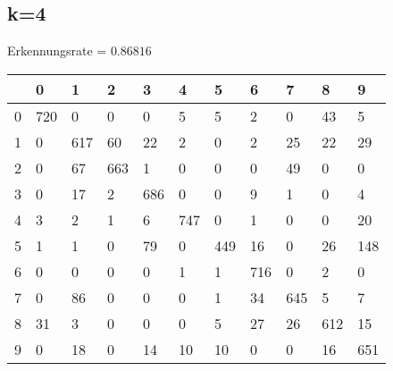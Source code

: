 \documentclass[a4paper,10pt]{article}
\begin{document}
		\subsection*{k=4}
		Erkennungsrate = $0.86816$\\
		\begin{tabular}{||l|l|l|l|l|l|l|l|l|l|l|}
		 \hline 
			& 0 & 1 & 2 & 3 & 4 & 5 & 6 & 7 & 8 & 9 \\ \hline \hline
			0 & 720    &  0 &     0    &  0   &   5   &   5  &    2  &    0   &  43  &    5\\ \hline
			1 &  0  &  617   &  60  &   22  &    2  &    0   &   2   &  25  &   22   &  29\\ \hline
			2 &0    & 67  &  663   &   1  &    0   &   0  &    0    & 49   &   0   &   0\\ \hline
			3 &0  &   17   &   2  &  686    &  0  &    0   &   9  &    1   &   0  &    4\\ \hline
			4 &3   &   2   &   1  &    6  &  747  &    0   &   1   &   0   &   0   &  20\\ \hline
			5 &1   &   1  &    0   &  79   &   0   & 449  &   16   &   0   &  26  &  148\\ \hline
			6 & 0  &    0    &  0   &   0  &    1  &    1  &  716   &   0   &   2  &    0\\ \hline
			7 &0   &  86   &   0    &  0    &  0  &    1  &   34  &  645   &   5  &    7\\ \hline
			8 & 31  &    3   &   0  &    0   &   0  &    5 &    27   &  26  &  612  &   15\\ \hline
			9 &  0   &  18  &    0    & 14  &   10   &  10     & 0   &   0   &  16  &  651\\ \hline
		\end{tabular}
		
\end{document}
